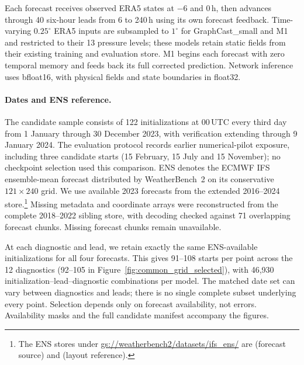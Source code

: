 \documentclass[11pt]{article}
\begin{document}
Each forecast receives observed ERA5 states at $-6$ and $0$\,h, then advances through 40 six-hour leads from 6 to 240\,h using its own forecast feedback. Time-varying $0.25^\circ$ ERA5 inputs are subsampled to $1^\circ$ for GraphCast\_small and M1 and restricted to their 13 pressure levels; these models retain static fields from their existing training and evaluation store. M1 begins each forecast with zero temporal memory and feeds back its full corrected prediction. Network inference uses bfloat16, with physical fields and state boundaries in float32.

\paragraph{Dates and ENS reference.}
The candidate sample consists of 122 initializations at 00\,UTC every third day from 1 January through 30 December 2023, with verification extending through 9 January 2024. The evaluation protocol records earlier numerical-pilot exposure, including three candidate starts (15 February, 15 July and 15 November); no checkpoint selection used this comparison. ENS denotes the ECMWF IFS ensemble-mean forecast distributed by WeatherBench~2 on its conservative $121\times240$ grid. We use available 2023 forecasts from the extended 2016--2024 store.\footnote{\raggedright The ENS stores under \url{gs://weatherbench2/datasets/ifs_ens/} are  (forecast source) and  (layout reference).} Missing metadata and coordinate arrays were reconstructed from the complete 2018--2022 sibling store, with decoding checked against 71 overlapping forecast chunks. Missing forecast chunks remain unavailable.

At each diagnostic and lead, we retain exactly the same ENS-available initializations for all four forecasts. This gives 91--108 starts per point across the 12 diagnostics (92--105 in Figure~\ref{fig:common_grid_selected}), with 46,930 initialization--lead--diagnostic combinations per model. The matched date set can vary between diagnostics and leads; there is no single complete subset underlying every point. Selection depends only on forecast availability, not errors. Availability masks and the full candidate manifest accompany the figures.
\end{document}
